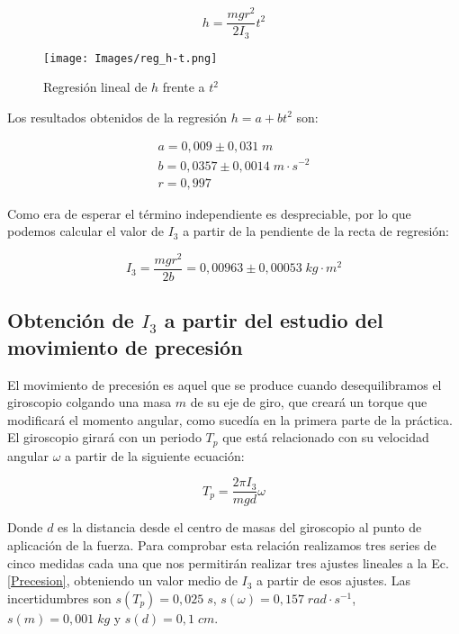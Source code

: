 \documentclass[a4paper,12pt,titlepage]{article}
\begin{document}
\begin{equation}
    h = \frac{mgr^2}{2I_3}t^2
\end{equation}

\begin{figure}[h!]
    \centering
    \texttt{[image: Images/reg\_h-t.png]}
    \caption{Regresión lineal de $h$ frente a $t^2$}
\end{figure}

\newpage

Los resultados obtenidos de la regresión $h=a+bt^2$ son:

\begin{equation}
    \begin{gathered}
        a = 0,009 \pm 0,031 \;m\\
        b = 0,0357 \pm 0,0014 \;m\cdot s^{-2}\\
        r = 0,997
    \end{gathered}
\end{equation}

Como era de esperar el término independiente es despreciable, por lo que podemos calcular el valor de $I_3$ a partir de la pendiente de la recta de regresión:

\begin{equation}
    I_3 = \frac{mgr^2}{2b} = 0,00963 \pm 0,00053 \;kg\cdot m^2
\end{equation}

\subsection{Obtención de $I_3$ a partir del estudio del movimiento de precesión}

El movimiento de precesión es aquel que se produce cuando desequilibramos el giroscopio colgando una masa $m$ de su eje de giro, que creará un torque que modificará el momento angular, como sucedía en la primera parte de la práctica. El giroscopio girará con un periodo $T_p$ que está relacionado con su velocidad angular $\omega$ a partir de la siguiente ecuación:

\begin{equation}
    T_p = \frac{2\pi I_3}{mgd}\omega
    \label{Precesion}
\end{equation}

Donde $d$ es la distancia desde el centro de masas del giroscopio al punto de aplicación de la fuerza. Para comprobar esta relación realizamos tres series de cinco medidas cada una que nos permitirán realizar tres ajustes lineales a la Ec.\ref{Precesion}, obteniendo un valor medio de $I_3$ a partir de esos ajustes. Las incertidumbres son $s(T_p)=0,025\;s$, $s(\omega)=0,157 \;rad\cdot s^{-1}$, $s(m)=0,001\;kg$ y $s(d)=0,1\;cm$.
\end{document}
